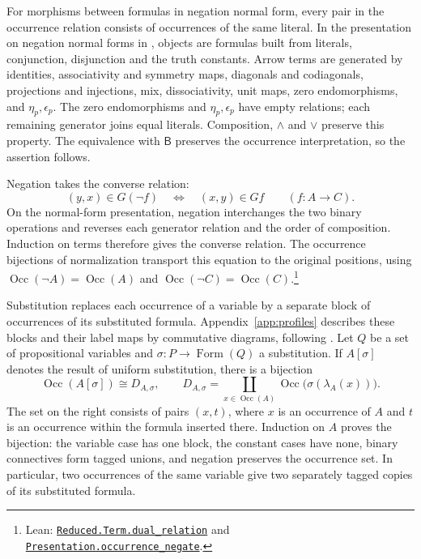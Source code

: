 \documentclass[11pt]{article}
\newcommand{\B}{\mathsf B}
\newcommand{\Occ}{\operatorname{Occ}}
\newcommand{\FormulaSet}{\operatorname{Form}}
\begin{document}
For morphisms between formulas in negation normal form, every pair in
the occurrence relation consists of occurrences of the same literal.
In the presentation on negation normal forms in
\cite[\S14.2, pp.~318--321]{DP}, objects are formulas built from
literals, conjunction, disjunction and the truth constants.
Arrow terms are generated by identities, associativity and symmetry
maps, diagonals and codiagonals, projections and injections, mix,
dissociativity, unit maps, zero endomorphisms, and $\eta_p,\epsilon_p$.
The zero endomorphisms and $\eta_p,\epsilon_p$ have empty relations;
each remaining generator joins equal literals.
Composition, $\wedge$ and $\vee$ preserve this property.
The equivalence with $\B$ preserves the occurrence interpretation,
so the assertion follows.

Negation takes the converse relation:
\[
 (y,x)\in G(\neg f)\quad\Longleftrightarrow\quad(x,y)\in Gf
 \qquad(f:A\to C).
\]
On the normal-form presentation, negation interchanges the two
binary operations and reverses each generator relation and the
order of composition. Induction on terms therefore gives the
converse relation. The occurrence bijections of normalization
transport this equation to the original positions, using
$\Occ(\neg A)=\Occ(A)$ and $\Occ(\neg C)=\Occ(C)$.\footnote{\raggedright Lean:
\href{https://github.com/flengyel/Dosen-Petric-Maximality/blob/dosen-petric-v25-palomar-v3/DosenPetric/ReducedDualRelations.lean\#L20}{\texttt{Reduced.Term.\allowbreak{}dual\_relation}} and
\href{https://github.com/flengyel/Dosen-Petric-Maximality/blob/dosen-petric-v25-palomar-v3/DosenPetric/PresentationNegationOccurrence.lean\#L25}{\texttt{Presentation.\allowbreak{}occurrence\_negate}}.}

Substitution replaces each occurrence of a variable by a separate
block of occurrences of its substituted formula.
Appendix~\ref{app:profiles} describes these blocks and their label maps
by commutative diagrams, following \cite[\S9]{Notation}.
Let $Q$ be a set of propositional variables and
$\sigma:P\to\FormulaSet(Q)$ a substitution. If $A[\sigma]$ denotes the
result of uniform substitution, there is a bijection
\begin{equation}
 \Occ(A[\sigma])\cong D_{A,\sigma},\qquad
 D_{A,\sigma}=\coprod_{x\in\Occ(A)}
                  \Occ\bigl(\sigma(\lambda_A(x))\bigr).
 \label{eq:occ-substitution}
\end{equation}
The set on the right consists of pairs $(x,t)$, where $x$ is an
occurrence of $A$ and $t$ is an occurrence within the formula inserted there.
Induction on $A$ proves the bijection: the variable case has one
block, the constant cases have none, binary connectives form tagged
unions, and negation preserves the occurrence set. In particular,
two occurrences of the same variable give two separately tagged
copies of its substituted formula.
\end{document}
